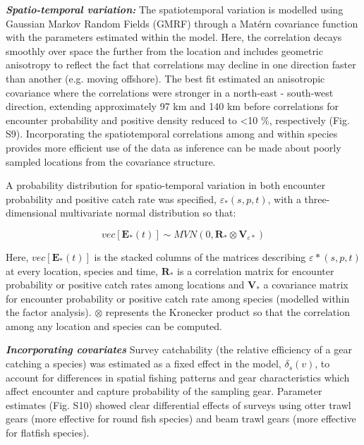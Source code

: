 \documentclass[12pt]{article}
\begin{document}
\begin{linenumbers}
\textbf{\textit{Spatio-temporal variation:}} The spatiotemporal variation is
modelled using Gaussian Markov Random Fields (GMRF)  through a Matérn covariance function with the
parameters estimated within the model. Here, the correlation decays smoothly
over space the further from the location and includes geometric anisotropy to
reflect the fact that correlations may decline in one direction faster than
another (e.g.  moving offshore)\cite{Thorson2013}.  The best fit estimated an
anisotropic covariance where the correlations were stronger in a north-east -
south-west direction, extending approximately 97 km and 140 km before
correlations for encounter probability and positive density reduced to
\textless 10 \%, respectively (Fig. S9). Incorporating the
spatiotemporal correlations among and within species provides more efficient
use of the data as inference can be made about poorly sampled locations from
the covariance structure.

A probability distribution for spatio-temporal variation in both encounter
probability and positive catch rate was specified, $\varepsilon_{*}(s,p,t)$,
with a three-dimensional multivariate normal distribution so that:

	\begin{equation}
		vec[\mathbf{E}_{*}(t)] \sim MVN(0,\mathbf{R}_{*} \otimes
		\mathbf{V}_{{\varepsilon}{*}})
	\end{equation}

Here, $vec[\mathbf{E}_{*}(t)]$ is the stacked columns of the matrices
describing $\varepsilon{*}(s,p,t)$ at every location, species and time,
$\mathbf{R}_{*}$ is a correlation matrix for encounter probability or positive
catch rates among locations and $\mathbf{V}_{*}$ a covariance matrix for
encounter probability or positive catch rate among species (modelled within the
factor analysis). $\otimes$ represents the Kronecker product so that the
correlation among any location and species can be computed\cite{Thorson2017}.
		
\textbf{\textit{Incorporating covariates}} Survey catchability (the relative
efficiency of a gear catching a species) was estimated as a fixed effect in the
model, $\delta_{s}(v)$, to account for differences in spatial fishing patterns
and gear characteristics which affect encounter and capture probability of the
sampling gear\cite{Thorson2014}. Parameter estimates (Fig. S10)
showed clear differential effects of surveys using otter trawl gears (more
effective for round fish species) and beam trawl gears (more effective for
flatfish species).


\end{linenumbers}
\end{document}
